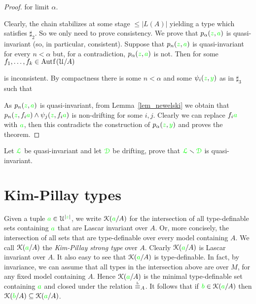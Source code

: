 \documentclass[creche.tex]{subfiles}
\begin{document}
\begin{proof}
\quad for limit $\alpha$.

\noindent Clearly, the chain stabilizes at some stage $\le|L(A)|$ yielding a type which satisfies $\sharp_2$. So we only need to prove consistency. We prove that $p_\alpha({\color{green} z},{\color{green} a})$ is quasi-invariant (so, in particular, consistent). Suppose that $p_n({\color{green} z},{\color{green} a})$ is quasi-invariant for every $n<\alpha$ but, for a contradiction, $p_\alpha({\color{green} z},{\color{green} a})$ is not. Then for some $f_1,\dots,f_k\in\mathord{\rm Aut\kern.15ex{f}\kern.15ex}(\EuScript U/A)$


\noindent is inconsistent. By compactness there is some $n<\alpha$ and some $\psi_i({\color{green} z},{\color{green} y})$ as in $\sharp_3$ such that


As $p_n({\color{green} z},{\color{green} a})$ is quasi-invariant, from Lemma~\ref{lem_newelski} we obtain that $p_n({\color{green} z},f_i{\color{green} a})\wedge\psi_j({\color{green} z},f_i{\color{green} a})$ is non-drifting for some $i,j$. Clearly we can replace $f_i{\color{green} a}$ with ${\color{green} a}$, then this contradicts the construction of $p_\alpha({\color{green} z},{\color{green} y})$ and proves the theorem.
\end{proof}

\begin{exercise}
Let ${\color{green}\EuScript L}$ be quasi-invariant and let ${\color{green}\EuScript D}$ be drifting, prove that  ${\color{green}\EuScript L}\smallsetminus{\color{green}\EuScript D}$ is quasi-invariant.\QED
\end{exercise}

\section{Kim-Pillay types}\label{KPtypes}


Given a tuple ${\color{green} a}\in\EuScript U^{|{\color{green} z}|}$, we write \emph{$\EuScript K({\color{green} a}/A)$\/} for the intersection of all type-definable sets containing ${\color{green} a}$ that are Lascar invariant over $A$. Or, more concisely, the intersection of all sets that are type-definable over every model containing $A$. We call $\EuScript K({\color{green} a}/A)$ the \emph{Kim-Pillay strong type\/} over $A$. Clearly $\EuScript K({\color{green} a}/A)$ is Lascar invariant over $A$.  It also easy to see that $\EuScript K({\color{green} a}/A)$ is type-definable. In fact, by invariance, we can assume that all types in the intersection above are over $M$, for any fixed model containing $A$. Hence $\EuScript K({\color{green} a}/A)$ is the minimal type-definable set containing ${\color{green} a}$ and closed under the relation $\equivL_A$. It follows that if ${\color{green} b}\in\EuScript K({\color{green} a}/A)$ then $\EuScript K({\color{green} b}/A)\subseteq\EuScript K({\color{green} a}/A)$.
\end{document}

